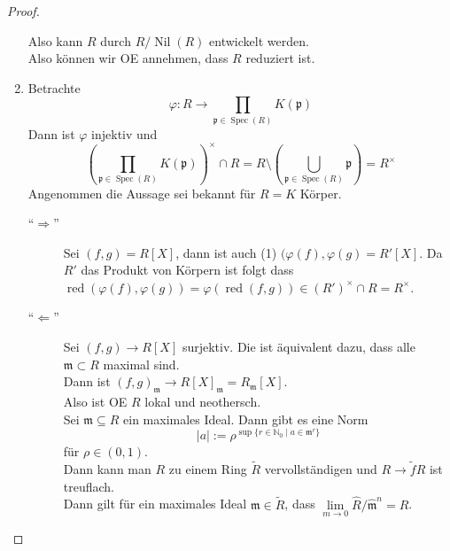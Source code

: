 \documentclass[10pt,a4paper]{article}
\newcommand{\N}{\ensuremath{\mathbb{N}}}
\newcommand{\norm}[1]{\left|#1\right|}
\newcommand{\Spec}{\ensuremath{\operatorname{Spec}}}
\newcommand{\Nil}{\ensuremath{\operatorname{Nil}}}
\newcommand{\res}{\ensuremath{\operatorname{red}}}
\theoremstyle{definition}
\theoremstyle{plain}
\theoremstyle{remark}
\begin{document}
\begin{proof}
\begin{enumerate}
		Also kann $R$ durch $R/\Nil(R)$ entwickelt werden.\\
		Also können wir OE annehmen, dass $R$ reduziert ist.
		\item Betrachte 
		\[\varphi:R\to\prod_{\mathfrak p\in \Spec(R)}K(\mathfrak p)\]
		Dann ist $\varphi$ injektiv und
		\[\left(\prod_{\mathfrak p\in \Spec(R)}K(\mathfrak p)\right)^\times\cap R=R\setminus\left(\bigcup_{\mathfrak p\in \Spec(R)}\mathfrak p\right)=R^\times\]
		Angenommen die Aussage sei bekannt für $R=K$ Körper.
		\begin{description}
			\item[``$\Rightarrow$''] Sei $(f,g)=R[X]$, dann ist auch (1) $(\varphi(f),\varphi(g)=R'[X]$. Da $R'$ das Produkt von Körpern ist folgt dass $\res(\varphi(f),\varphi(g))=\varphi(\res(f,g))\in(R')^\times\cap R=R^\times$.
			\item[``$\Leftarrow$''] Sei $(f,g)\to R[X]$ surjektiv. Die ist äquivalent dazu, dass alle $\mathfrak m\subset R$ maximal sind.\\
			Dann ist $(f,g)_{\mathfrak m}\to R[X]_{\mathfrak m}=R_{\mathfrak m}[X]$.\\
			Also ist OE $R$ lokal und neothersch.\\
			Sei $\mathfrak m\subseteq R$ ein maximales Ideal. Dann gibt es eine Norm
			\[\norm{a}:=\rho^{\sup\{r\in \N_0\mid a\in\mathfrak m^r\}}\]
			für $\rho\in(0,1)$.\\
			Dann kann man $R$ zu einem Ring $\tilde{R}$ vervollständigen und $R\to\tilde{ f} R$ ist treuflach.\\
			Dann gilt für ein maximales Ideal $\mathfrak m\in\tilde{R}$, dass $\lim\limits_{m\to 0}\hat{R}/\hat{\mathfrak m}^n=\hat R$. 
		\end{description}
	\end{enumerate}
\end{proof}
\end{document}
